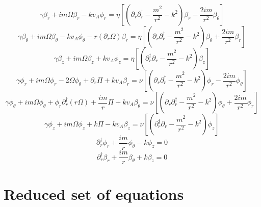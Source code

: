 \documentclass[letterpaper]{article}
\begin{document}
\begin{equation}\label{eqn:globalcode:rind_p}
\gamma \beta_r + im\Omega\beta_r - kv_A\phi_r
 = \eta\left[\left(\partial_r \partial_r^\dagger
 - \frac{m^2}{r^2} - k^2\right)\beta_r - \frac{2im}{r^2}\beta_\theta\right]
\end{equation}
\begin{equation}\label{eqn:globalcode:tind_p}
\gamma \beta_\theta + im\Omega\beta_\theta - kv_A \phi_\theta
 - r(\partial_r \Omega)\beta_r
 = \eta\left[\left(\partial_r \partial_r^\dagger
 - \frac{m^2}{r^2} - k^2\right)\beta_\theta + \frac{2im}{r^2}\beta_r\right]
\end{equation}
\begin{equation}\label{eqn:globalcode:zind_p}
\gamma \beta_z + im\Omega\beta_z + kv_A \phi_z
 = \eta\left[\left(\partial_r^\dagger \partial_r
 -\frac{m^2}{r^2} - k^2\right)\beta_z\right]
\end{equation}
\begin{equation}\label{eqn:globalcode:reul_p}
\gamma \phi_r + im\Omega\phi_r - 2\Omega\phi_\theta + \partial_r \Pi
 + kv_A\beta_r = \nu\left[\left(\partial_r \partial_r^\dagger
 - \frac{m^2}{r^2} - k^2\right)\phi_r - \frac{2im}{r^2}\phi_\theta\right]
\end{equation}
\begin{equation}\label{eqn:globalcode:teul_p}
\gamma \phi_\theta + im\Omega\phi_\theta + \phi_r \partial_r^\dagger(r\Omega)
 + \frac{im}{r}\Pi + kv_A \beta_\theta
 = \nu\left[\left(\partial_r \partial_r^\dagger - \frac{m^2}{r^2} 
 - k^2\right)\phi_\theta + \frac{2im}{r^2}\phi_r\right]
\end{equation}
\begin{equation}\label{eqn:globalcode:zeul_p}
\gamma \phi_z + im\Omega{\phi_z} + k\Pi - kv_A \beta_z
 = \nu\left[\left(\partial_r^\dagger \partial_r 
 - \frac{m^2}{r^2} - k^2\right)\phi_z\right]
\end{equation}
\begin{equation}\label{eqn:globalcode:inc_p}
\partial_r^\dagger \phi_r + \frac{im}{r}\phi_\theta - k\phi_z = 0
\end{equation}
\begin{equation}\label{eqn:globalcode:delB_p}
\partial_r^\dagger \beta_r + \frac{im}{r}\beta_\theta + k\beta_z = 0
\end{equation}

\section{Reduced set of equations}
\end{document}
